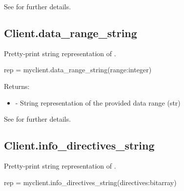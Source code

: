 See  for further details.


\subsection{Client.data_range_string}

\summary

Pretty-print string representation of .

\format

\pyspecificstart
\begin{codepar}
rep = myclient.data_range_string(range:integer)
\end{codepar}
\pyspecificend

\begin{arglist}
\end{arglist}

Returns:
\begin{itemize}
    \item {} - String representation of the provided data range (str)
\end{itemize}

See  for further details.


\subsection{Client.info_directives_string}

\summary

Pretty-print string representation of .

\format

\pyspecificstart
\begin{codepar}
rep = myclient.info_directives_string(directives:bitarray)
\end{codepar}
\pyspecificend

\begin{arglist}
\end{arglist}


